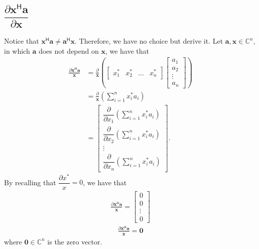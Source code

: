 \documentclass{article}
\newcommand{\hermit}{\mathsf{H}}
\begin{document}
\subsection{\(\dfrac{\partial \mathbf{x}^\hermit \mathbf{a}}{\partial \mathbf{x}}\)}
Notice that \(\mathbf{x}^\hermit \mathbf{a} \neq \mathbf{a}^\hermit \mathbf{x}\). Therefore, we have no choice but derive it. Let \(\mathbf{a, x} \in \mathbb{C}^{n}\), in which \(\mathbf{a}\) does not depend on \(\mathbf{x}\), we have that
\begin{align}
    \frac{\partial \mathbf{x}^\hermit \mathbf{a}}{\mathbf{x}} & = \frac{\partial}{\mathbf{x}} \left(
    \begin{bmatrix}
        x^*_1 & x^*_2 & \dots & x^*_n
    \end{bmatrix} \begin{bmatrix}
        a_{1} \\ a_{2} \\ \vdots \\ a_{n}
    \end{bmatrix} \right) \\
    & = \frac{\partial}{\mathbf{x}} \left( \sum_{i = 1}^n x^*_ia_i \right) \\
    &= \begin{bmatrix}
            \dfrac{\partial}{\partial x_1} \left( \sum_{i = 1}^n x^*_ia_i \right) \\ \dfrac{\partial}{\partial x_2} \left( \sum_{i = 1}^n x^*_ia_i \right) \\ \vdots \\
            \dfrac{\partial}{\partial x_n} \left( \sum_{i = 1}^n x^*_ia_i \right)
        \end{bmatrix}.
\end{align}
By recalling that \(\dfrac{\partial x^*}{x} = 0\), we have that
\begin{align}
    \frac{\partial \mathbf{x}^\hermit \mathbf{a}}{\mathbf{x}} = \begin{bmatrix}
        0 \\ 0 \\ \vdots \\ 0
    \end{bmatrix}
\end{align}
\begin{align}
    \boxed{\frac{\partial \mathbf{x}^\hermit \mathbf{a}}{\mathbf{x}} = \mathbf{0}}
\end{align}
where \(\mathbf{0} \in \mathbb{C}^n\) is the zero vector.
\end{document}
